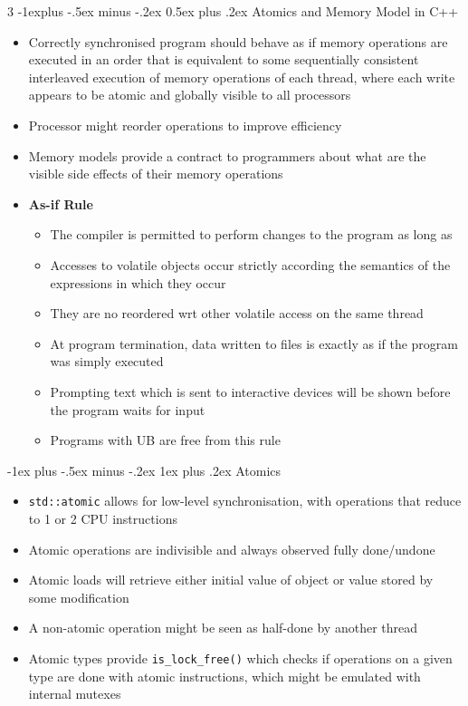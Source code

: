 \documentclass[10pt, landscape]{article}
\makeatletter
\renewcommand{\section}{\@startsection{section}{1}{0mm}%
                                {-1ex plus -.5ex minus -.2ex}%
                                {0.5ex plus .2ex}%
                                {\normalfont\large\bfseries}}
\renewcommand{\section}{\@startsection{section}{2}{0mm}%
                                {-1explus -.5ex minus -.2ex}%
                                {0.5ex plus .2ex}%
                                {\normalfont\normalsize\bfseries}}
\renewcommand{\subsection}{\@startsection{subsection}{3}{0mm}%
                                {-1ex plus -.5ex minus -.2ex}%
                                {1ex plus .2ex}%
                                {\normalfont\small\bfseries}}%
\makeatother
\begin{document}
\begin{multicols*}{3}
\section{Atomics and Memory Model in C++}
\begin{itemize}
    \item Correctly synchronised program should behave as if memory operations are executed in an order that is equivalent to some sequentially consistent interleaved execution of memory operations of each thread, where each write appears to be atomic and globally visible to all processors
    \item Processor might reorder operations to improve efficiency
    \item Memory models provide a contract to programmers about what are the visible side effects of their memory operations
    \item \textbf{As-if Rule}
    \begin{itemize}
        \item The compiler is permitted to perform changes to the program as long as
        \item Accesses to volatile objects occur strictly according the semantics of the expressions in which they occur
        \item They are no reordered wrt other volatile access on the same thread
        \item At program termination, data written to files is exactly as if the program was simply executed
        \item Prompting text which is sent to interactive devices will be shown before the program waits for input
        \item Programs with UB are free from this rule
    \end{itemize}
\end{itemize}

\subsection{Atomics}
\begin{itemize}
    \item \verb|std::atomic| allows for low-level synchronisation, with operations that reduce to 1 or 2 CPU instructions
    \item Atomic operations are indivisible and always observed fully done/undone
    \item Atomic loads will retrieve either initial value of object or value stored by some modification
    \item A non-atomic operation might be seen as half-done by another thread
    \item Atomic types provide \verb|is_lock_free()| which checks if operations on a given type are done with atomic instructions, which might be emulated with internal mutexes
\end{itemize}


\end{multicols*}
\end{document}
